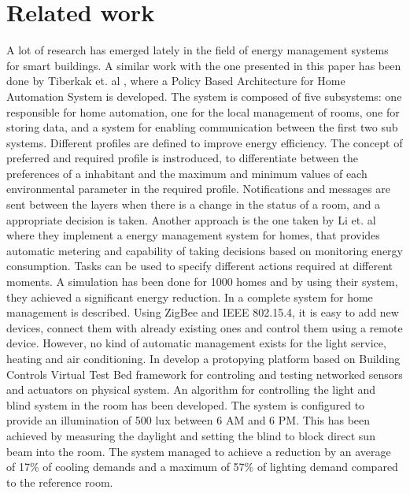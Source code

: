 \section{Related work}
A lot of research has emerged lately in the field of energy management systems for smart buildings. 
A similar work with the one presented in this paper has been done by Tiberkak et. al \cite{Tiberkak10}, where a Policy Based Architecture for Home Automation
System is developed. The system is composed of five subsystems: one responsible
for home automation, one for the local management of rooms, one
for storing data, and a system for enabling communication between the first
two sub systems. Different profiles are defined to improve energy efficiency.
The concept of preferred and required profile is instroduced, to differentiate
between the preferences of a inhabitant and the maximum and minimum values
of each environmental parameter in the required profile. Notifications
and messages are sent between the layers when there is a change in the
status of a room, and a appropriate decision is taken.
Another approach is the one taken by Li et. al \cite{Li11} where they implement a energy management system for homes, that provides automatic metering and capability of taking decisions based on monitoring energy consumption. 
Tasks can be used to specify different actions required at different moments. A simulation has been done for 1000 homes and by using their system, they achieved a significant energy reduction.
In \cite{Han10} a complete system for home management is described. Using ZigBee and IEEE 802.15.4, it is easy to add new devices, connect them with already existing  ones and control them using a remote device. However, no kind of automatic management exists for the light service, heating and air conditioning. In \cite{Wen11} develop a protopying platform based on Building Controls Virtual Test Bed framework \cite{Bcvtb} for controling and testing networked sensors and actuators on physical system. An algorithm for controlling the light and blind system in the room has been developed. The system is configured to provide an illumination of 500 lux between 6 AM and 6 PM. This has been achieved by measuring the daylight and setting the blind to block direct sun beam into the room. The system managed to achieve a reduction by an average of 17\% of cooling demands and a maximum of 57\% of lighting demand compared to the reference room. 
